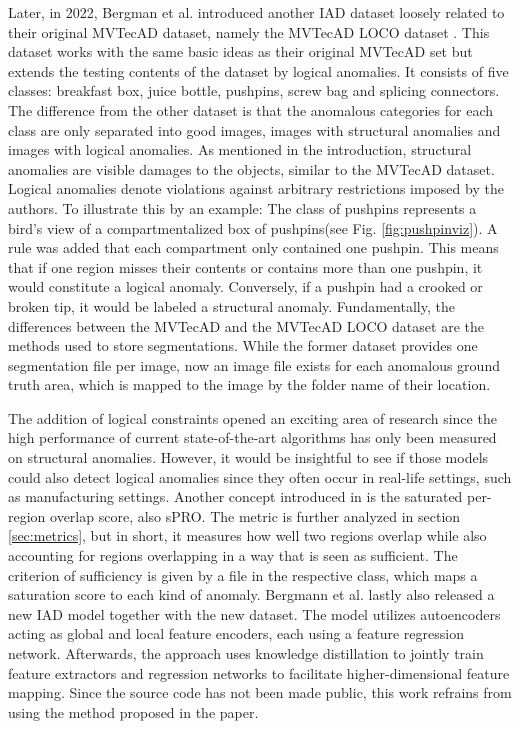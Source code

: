 Later, in 2022, Bergman et al. introduced another IAD dataset loosely related to their original MVTecAD dataset, namely the MVTecAD LOCO dataset \cite{LOCODentsAndScratchesBergmann2022}. 
This dataset works with the same basic ideas as their original MVTecAD set but extends the testing contents of the dataset by logical anomalies. 
It consists of five classes: breakfast box, juice bottle, pushpins, screw bag and splicing connectors. The difference from the other dataset is that the anomalous categories for each class are only separated into good images, images with structural anomalies 
and images with logical anomalies. As mentioned in the introduction, structural anomalies are visible damages to the objects, similar to the MVTecAD dataset. Logical anomalies denote violations against arbitrary restrictions 
imposed by the authors. To illustrate this by an example: The class of pushpins represents a bird's view of a compartmentalized box of pushpins(see Fig. \ref{fig:pushpinviz}). A rule was added 
that each compartment only contained one pushpin. This means that if one region misses their contents or contains more than one pushpin, it would constitute a logical anomaly. Conversely, if a pushpin had a crooked or broken tip, it would be labeled a structural anomaly. Fundamentally, the differences between the 
MVTecAD and the MVTecAD LOCO dataset are the methods used to store segmentations. While the former dataset provides one segmentation file per image, now an image file exists for each anomalous ground truth area, which is mapped to the image by the folder name of their location.




The addition of logical constraints opened an exciting area of research since the high performance 
of current state-of-the-art algorithms has only been measured on structural anomalies. However, it would be insightful to see if those models could also detect logical anomalies since they often occur 
in real-life settings, such as manufacturing settings. Another concept introduced in \cite{LOCODentsAndScratchesBergmann2022} is the 
saturated per-region overlap score, also sPRO. The metric is further analyzed in section \ref{sec:metrics}, but in short, it measures how well two regions overlap while also accounting for regions overlapping in a way that is seen as sufficient. The criterion of 
sufficiency is given by a file in the respective class, which maps a saturation score to each kind of anomaly.
Bergmann et al.\cite{LOCODentsAndScratchesBergmann2022} lastly also released a new IAD model together with the new dataset. The model utilizes autoencoders acting 
as global and local feature encoders, each using a feature regression network. Afterwards, the approach uses knowledge distillation to jointly train 
feature extractors and regression networks to facilitate higher-dimensional feature mapping. Since the source code has not been made public, 
this work refrains from using the method proposed in the paper.


